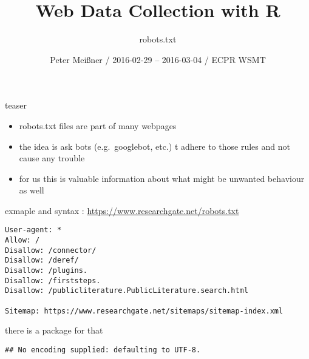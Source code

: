 \documentclass[ignorenonframetext,]{beamer}
\title{Web Data Collection with R}
\subtitle{robots.txt}
\author{Peter Meißner / 2016-02-29 -- 2016-03-04 / ECPR WSMT}
\date{}
\newenvironment{Shaded}{\begin{snugshade}}{\end{snugshade}}
\newcommand{\KeywordTok}[1]{\textcolor[rgb]{0.13,0.29,0.53}{\textbf{{#1}}}}
\newcommand{\DataTypeTok}[1]{\textcolor[rgb]{0.13,0.29,0.53}{{#1}}}
\newcommand{\StringTok}[1]{\textcolor[rgb]{0.31,0.60,0.02}{{#1}}}
\newcommand{\NormalTok}[1]{{#1}}
\providecommand{\tightlist}{%
  \setlength{\itemsep}{0pt}\setlength{\parskip}{0pt}}
\begin{document}
\frame{\titlepage}

\begin{frame}
\tableofcontents[hideallsubsections]
\end{frame}

\begin{frame}{teaser}

\begin{itemize}
\tightlist
\item
  robots.txt files are part of many webpages
\item
  the idea is ask bots (e.g.~googlebot, etc.) t adhere to those rules
  and not cause any trouble
\item
  for us this is valuable information about what might be unwanted
  behaviour as well
\end{itemize}

\end{frame}

\begin{frame}[fragile]{exmaple and syntax :
\url{https://www.researchgate.net/robots.txt}}

\begin{verbatim}
User-agent: *
Allow: /
Disallow: /connector/
Disallow: /deref/
Disallow: /plugins.
Disallow: /firststeps.
Disallow: /publicliterature.PublicLiterature.search.html

Sitemap: https://www.researchgate.net/sitemaps/sitemap-index.xml
\end{verbatim}

\end{frame}

\begin{frame}[fragile]{there is a package for that}

\begin{Shaded}
\end{Shaded}

\begin{verbatim}
## No encoding supplied: defaulting to UTF-8.
\end{verbatim}

\end{frame}
\end{document}
